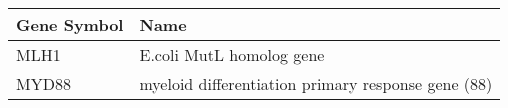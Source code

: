 \begin{tabular}{ll}
\toprule
Gene Symbol &                                               Name \\
\midrule
       MLH1 &                           E.coli MutL homolog gene \\
      MYD88 & myeloid differentiation primary response gene (88) \\
\bottomrule
\end{tabular}

